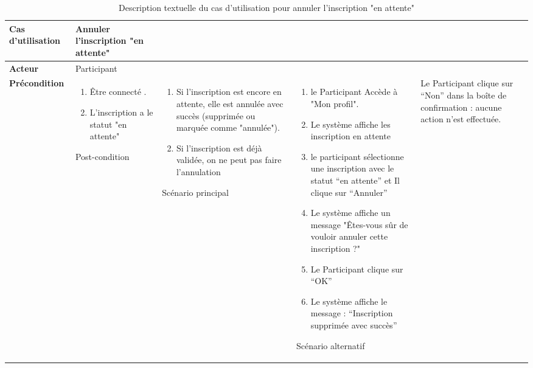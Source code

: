 \begin{longtable}{|>{\bfseries}p{4cm}|p{10cm}|}
\hline
Cas d’utilisation & Annuler l'inscription "en attente" \\
\hline
Acteur & Participant \\
\hline
Précondition &
\begin{enumerate}
  \item Être connecté .
  \item L'inscription a le statut "en attente"
  \end{enumerate} 
\hline
Post-condition & 
\begin{enumerate}
    \item Si l'inscription est encore en attente, elle est annulée avec succès (supprimée ou marquée comme "annulée").
    \item Si l'inscription est déjà validée, on ne peut pas faire l'annulation
\end{enumerate}
\hline
Scénario principal & 
\begin{enumerate}
  \item le Participant Accède à "Mon profil".
  \item Le système affiche les inscription en attente 
  \item le participant sélectionne une inscription avec le statut “en attente” et Il clique sur “Annuler”
\item Le système affiche un message "Êtes-vous sûr de vouloir annuler cette inscription ?" 
\item  Le Participant clique sur “OK”
\item  Le système affiche le message : “Inscription supprimée avec succès”

\end{enumerate} 
\hline
Scénario alternatif & Le Participant clique sur “Non” dans la boîte de confirmation : aucune action n’est effectuée.
\hline
\caption{Description textuelle du cas d’utilisation pour annuler l’inscription "en attente"}
\end{longtable}

